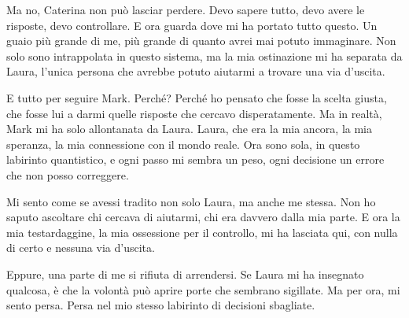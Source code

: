 Ma no, Caterina non può lasciar perdere. Devo sapere tutto, devo avere le risposte, devo controllare. E ora guarda dove mi ha portato tutto questo. Un guaio più grande di me, più grande di quanto avrei mai potuto immaginare. Non solo sono intrappolata in questo sistema, ma la mia ostinazione mi ha separata da Laura, l’unica persona che avrebbe potuto aiutarmi a trovare una via d’uscita.

E tutto per seguire Mark. Perché? Perché ho pensato che fosse la scelta giusta, che fosse lui a darmi quelle risposte che cercavo disperatamente. Ma in realtà, Mark mi ha solo allontanata da Laura. Laura, che era la mia ancora, la mia speranza, la mia connessione con il mondo reale. Ora sono sola, in questo labirinto quantistico, e ogni passo mi sembra un peso, ogni decisione un errore che non posso correggere.

Mi sento come se avessi tradito non solo Laura, ma anche me stessa. Non ho saputo ascoltare chi cercava di aiutarmi, chi era davvero dalla mia parte. E ora la mia testardaggine, la mia ossessione per il controllo, mi ha lasciata qui, con nulla di certo e nessuna via d'uscita.

Eppure, una parte di me si rifiuta di arrendersi. Se Laura mi ha insegnato qualcosa, è che la volontà può aprire porte che sembrano sigillate. Ma per ora, mi sento persa. Persa nel mio stesso labirinto di decisioni sbagliate.

